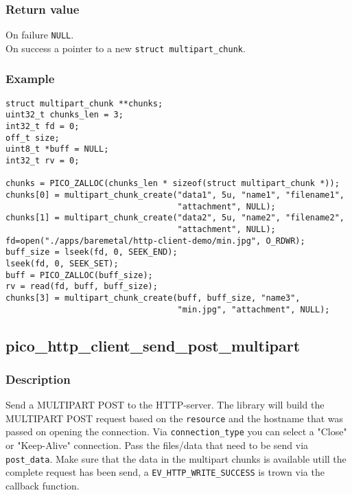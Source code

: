 \subsubsection*{Return value}
On failure \texttt{NULL}.
\\On success a pointer to a new \texttt{struct multipart\_chunk}.
\subsubsection*{Example}
\begin{verbatim}
struct multipart_chunk **chunks;
uint32_t chunks_len = 3;
int32_t fd = 0;
off_t size;
uint8_t *buff = NULL;
int32_t rv = 0;

chunks = PICO_ZALLOC(chunks_len * sizeof(struct multipart_chunk *));
chunks[0] = multipart_chunk_create("data1", 5u, "name1", "filename1", 
                                   "attachment", NULL);
chunks[1] = multipart_chunk_create("data2", 5u, "name2", "filename2", 
                                   "attachment", NULL);
fd=open("./apps/baremetal/http-client-demo/min.jpg", O_RDWR);
buff_size = lseek(fd, 0, SEEK_END);
lseek(fd, 0, SEEK_SET);
buff = PICO_ZALLOC(buff_size);
rv = read(fd, buff, buff_size);
chunks[3] = multipart_chunk_create(buff, buff_size, "name3", 
                                   "min.jpg", "attachment", NULL);
\end{verbatim}



\subsection{pico\_http\_client\_send\_post\_multipart}

\subsubsection*{Description}
Send a MULTIPART POST to the HTTP-server. The library will build the MULTIPART POST request based on the \texttt{resource} and the hostname that was passed on opening the connection. Via \texttt{connection\_type} you can select a "Close" or "Keep-Alive" connection. Pass the files/data that need to be send via \texttt{post\_data}. Make sure that the data in the multipart chunks is available utill the complete request has been send, a \texttt{EV\_HTTP\_WRITE\_SUCCESS} is trown via the callback function.

